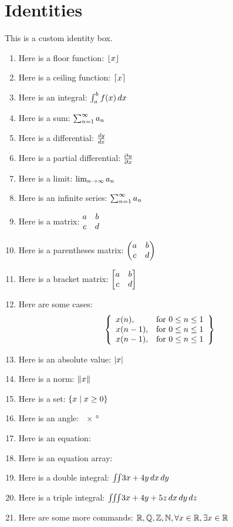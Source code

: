 \documentclass[openany]{book}
\begin{document}
\section{Identities}
\begin{myidentity}
This is a custom identity box.
\begin{enumerate}
    \item Here is a floor function: $\floor{x}$
    \item Here is a ceiling function: $\ceil{x}$
    \item Here is an integral: $\intg{a}{b}{f(x)}$
    \item Here is a sum: $\sumg{n=1}{\infty}{a_n}$
    \item Here is a differential: $\diff{y}{x}$
    \item Here is a partial differential: $\pdiff{u}{x}$
    \item Here is a limit: $\limit{n}{\infty}{a_n}$
    \item Here is an infinite series: $\infseries{n=1}{a_n}$
    \item Here is a matrix: $\mat{a & b \\ c & d}$
    \item Here is a parentheses matrix: $\pmat{a & b \\ c & d}$
    \item Here is a bracket matrix: $\bmat{a & b \\ c & d}$
    \item Here are some cases: 
\[
\mycases{
  1 & \text{if} x \ge 0 \\
  -1 & \text{if} x < 0
}
\]
    \item Here is an absolute value: $\abs{x}$
    \item Here is a norm: $\norm{x}$
    \item Here is a set: $\set{x \mid x \ge 0}$
    \item Here is an angle: $\ang{x}$
    \item Here is an equation: 
    \item Here is an equation array: 
    \newpage
    \item Here is a double integral: $\iintd{3x+4y}$
    \item Here is a triple integral: $\iiintd{3x+4y+5z}$
    \item Here are some more commands: $\R, \Q, \Z, \N, \forallx, \existsx$
\end{enumerate}
\end{myidentity}
\end{document}
